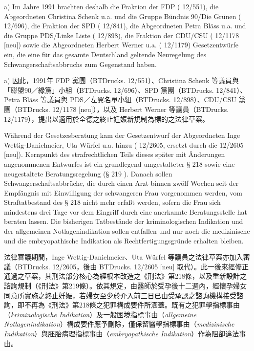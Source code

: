 \documentclass[12pt]{article}
\begin{document}
\begin{sourcepara}[title={原文理由 A.II.2.a} Rn 35]
a) Im Jahre 1991 brachten deshalb die Fraktion der FDP (\abbrBTDrucks{} 12/551), die Abgeordneten Christina Schenk u.a. und die Gruppe Bündnis 90/Die Grünen (\abbrBTDrucks{} 12/696), die Fraktion der SPD (\abbrBTDrucks{} 12/841), die Abgeordneten Petra Bläss u.a. und die Gruppe PDS/Linke Liste (\abbrBTDrucks{} 12/898), die Fraktion der CDU/CSU (\abbrBTDrucks{} 12/1178 [neu]) sowie die Abgeordneten Herbert Werner u.a. (\abbrBTDrucks{} 12/1179) Gesetzentwürfe ein, die eine für das gesamte Deutschland geltende Neuregelung des Schwangerschaftsabbruchs zum Gegenstand haben.
\end{sourcepara}
\begin{transpara}
a) 因此，1991年 FDP 黨團（BTDrucks. 12/551）、Christina Schenk 等議員與「聯盟90／綠黨」小組（BTDrucks. 12/696）、SPD 黨團（BTDrucks. 12/841）、Petra Bläss 等議員與 PDS／左翼名單小組（BTDrucks. 12/898）、CDU/CSU 黨團（BTDrucks. 12/1178 [neu]），以及 Herbert Werner 等議員（BTDrucks. 12/1179），提出以適用於全德之終止妊娠新規制為標的之法律草案。
\end{transpara}

\begin{sourcepara}[title={原文理由 A.II.2.a} Rn 36]
Während der Gesetzesberatung kam der Gesetzentwurf der Abgeordneten Inge Wettig-Danielmeier, Uta Würfel u.a. hinzu (\abbrBTDrucks{} 12/2605, ersetzt durch die \abbrBTDrucks{} 12/2605 [neu]). Kernpunkt des strafrechtlichen Teils dieses später mit Änderungen angenommenen Entwurfes ist ein grundlegend umgestalteter § 218 \abbrStGB{} sowie eine neugestaltete Beratungsregelung (§ 219 \abbrStGB{}). Danach sollen Schwangerschaftsabbrüche, die durch einen Arzt binnen zwölf Wochen seit der Empfängnis mit Einwilligung der schwangeren Frau vorgenommen werden, vom Straftatbestand des § 218 \abbrStGB{} nicht mehr erfaßt werden, sofern die Frau sich mindestens drei Tage vor dem Eingriff durch eine anerkannte Beratungsstelle hat beraten lassen. Die bisherigen Tatbestände der kriminologischen Indikation und der allgemeinen Notlagenindikation sollen entfallen und nur noch die medizinische und die embryopathische Indikation als Rechtfertigungsgründe erhalten bleiben.
\end{sourcepara}
\begin{transpara}
法律審議期間，Inge Wettig-Danielmeier、Uta Würfel 等議員之法律草案亦加入審議（BTDrucks. 12/2605，後由 BTDrucks. 12/2605 [neu] 取代）。此一後來經修正通過之草案，其刑法部分核心為經根本改造之《刑法》第218條，以及重新設計之諮詢規制（《刑法》第219條）。依其規定，由醫師於受孕後十二週內，經懷孕婦女同意所實施之終止妊娠，若婦女至少於介入前三日已由受承認之諮詢機構接受諮詢，即不再為《刑法》第218條之犯罪構成要件所涵蓋。既有之犯罪學指標事由（\textit{kriminologische Indikation}）及一般困境指標事由（\textit{allgemeine Notlagenindikation}）構成要件應予刪除，僅保留醫學指標事由（\textit{medizinische Indikation}）與胚胎病理指標事由（\textit{embryopathische Indikation}）作為阻卻違法事由。
\end{transpara}
\end{document}
